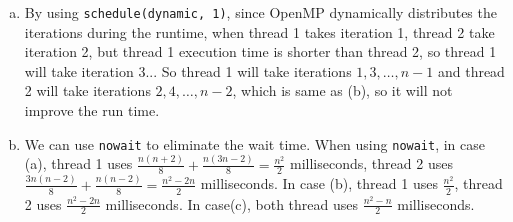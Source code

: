 \documentclass[10pt,a4paper]{article}
\theoremstyle{dotlessP}
\begin{document}
\begin{enumerate}[(a)]
	\item By using \texttt{schedule(dynamic, 1)}, since OpenMP dynamically distributes the iterations during the runtime, when thread 1 takes iteration 1, thread 2 take iteration 2, but thread 1 execution time is shorter than thread 2, so thread 1 will take iteration 3... So thread 1 will take iterations $1, 3, \ldots, n-1$ and thread 2 will take iterations $2, 4, \ldots, n-2$, which is same as (b), so it will not improve the run time.
	
	\item We can use \texttt{nowait} to eliminate the wait time. When using \texttt{nowait}, in case (a), thread 1 uses $\frac{n(n+2)}{8}+\frac{n(3n-2)}{8}=\frac{n^2}{2}$ milliseconds, thread 2 uses $\frac{3n(n-2)}{8}+\frac{n(n-2)}{8}=\frac{n^2-2n}{2}$ milliseconds. In case (b), thread 1 uses $\frac{n^2}{2}$, thread 2 uses $\frac{n^2-2n}{2}$ milliseconds. In case(c), both thread uses $\frac{n^2-n}{2}$ milliseconds.
	
\end{enumerate}
\end{document}
